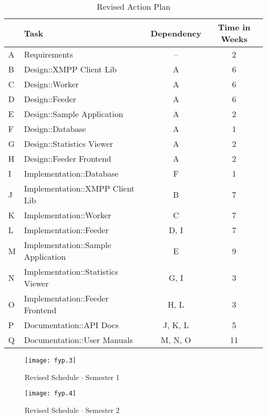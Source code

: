 \begin{table}[H]
\begin{tabularx}{\linewidth}{llcc}
\toprule
\textbf{} & \textbf{Task} & \textbf{Dependency} & \textbf{Time in Weeks} \\
\midrule
\endhead
A & Requirements                       & --      & 2  \\
B & Design::XMPP Client Lib            & A       & 6  \\
C & Design::Worker                     & A       & 6  \\
D & Design::Feeder                     & A       & 6  \\
E & Design::Sample Application         & A       & 2  \\
F & Design::Database                   & A       & 1  \\
G & Design::Statistics Viewer          & A       & 2  \\
H & Design::Feeder Frontend            & A       & 2  \\
I & Implementation::Database           & F       & 1  \\
J & Implementation::XMPP Client Lib    & B       & 7  \\
K & Implementation::Worker             & C       & 7  \\
L & Implementation::Feeder             & D, I    & 7  \\
M & Implementation::Sample Application & E       & 9  \\
N & Implementation::Statistics Viewer  & G, I    & 3  \\
O & Implementation::Feeder Frontend    & H, L    & 3  \\
P & Documentation::API Docs            & J, K, L & 5  \\
Q & Documentation::User Manuals        & M, N, O & 11 \\
\bottomrule
\end{tabularx}
\caption{Revised Action Plan}
\label{tab:rev_actionplan}
\end{table}

\begin{figure}[H]
\begin{flushleft}
\texttt{[image: fyp.3]}
\end{flushleft}
\caption{Revised Schedule $\cdot$ Semester 1}
\label{fig:rev_gantt1}
\end{figure}

\begin{figure}[H]
\begin{flushleft}
\texttt{[image: fyp.4]}
\end{flushleft}
\caption{Revised Schedule $\cdot$ Semester 2}
\label{fig:rev_gantt2}
\end{figure}

